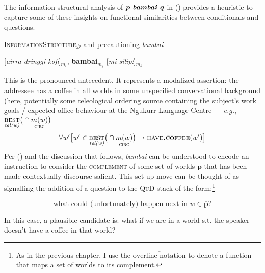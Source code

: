 The information-structural analysis of $ \boldsymbol{p \textit{ \textbf{bambai }}q} $ in () provides a heuristic to capture some of these insights on functional similarities between conditionals and questions.


\pex[labelformat=$\boldsymbol m_A$,pexcnt=105]  \textsc{InformationStructure}$ _\mathcal D $ and precautioning \emph{bambai}

[\textit{airra dringgi kofi}]$_{m_i}$, \textbf{bambai}$ _{m_j} $ [\textit{mi silip!}]$_{m_k}$


	\a This is the pronounced antecedent. It represents a modalized assertion: the addressee has a coffee in all worlds in some unspecified conversational background (here, potentially some teleological ordering source containing the subject's work goals / expected office behaviour at the Ngukurr Language Centre --- \textit{e.g.}, $ \underset{\textit{tel(w)}}{\textsc{best}}\big(\cap\underset{\textsc{circ}}{m(w)}\big)  $
	$$\forall w'\big[w'\in\underset{\textit{tel(w)}}{\textsc{best}}\big(\cap\underset{\textsc{circ}}{m(w)}\big) \to \textsc{have.coffee}(w')\big]$$
	\a {} Per () and the discussion that follows, \textit{bambai} can be understood to encode an instruction to consider the \textsc{complement} of some set of worlds $ \boldsymbol p $ that has been made contextually discourse-salient. This set-up move can be thought of as signalling the addition of a question to the \textsc{QuD} stack of the form:\footnote{As in the previous chapter, I use the $ \overline{\text{overline notation}} $ to denote a function that maps a set of worlds to its complement.}
	
	 $$\text{what could (unfortunately) happen next in } w\in\overline{\boldsymbol p}\text{?}$$
	
	 In this case, a plausible candidate is: what if we are in a world s.t. the speaker doesn't have a coffee in that world? 
	
